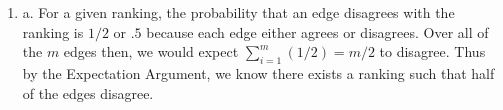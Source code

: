 \documentclass[11pt]{amsart}
\begin{document}
\begin{enumerate}
{b. 



}


\item {} 

{
a. For a given ranking, the probability that an edge disagrees with the ranking is $1/2$ or $.5$ because each edge either agrees or disagrees. Over all of the $m$ edges then, we would expect  $\sum_{i=1}^{m} (1/2) = m/2$ to disagree. Thus by the Expectation Argument, we know there exists a ranking such that half of the edges disagree. 


}
\end{enumerate}
\end{document}
